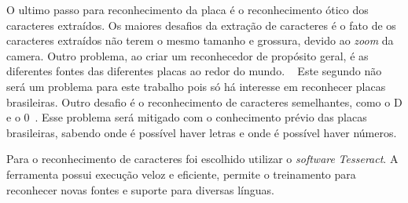 O ultimo passo para reconhecimento da placa é o reconhecimento ótico dos caracteres extraídos. Os maiores
desafios da extração de caracteres é o fato de os caracteres extraídos não terem o mesmo tamanho e grossura, devido 
ao \emph{zoom} da camera. Outro problema, ao criar um reconhecedor de propósito geral, é as diferentes fontes das diferentes 
placas ao redor do mundo. ~\cite{s2013automatic} Este segundo não será um problema para este trabalho pois só há interesse em 
reconhecer placas brasileiras. Outro desafio é o reconhecimento de caracteres semelhantes, como o D e o 0~\cite{ho2016intelligent}.
Esse problema será mitigado com o conhecimento prévio das placas brasileiras, sabendo onde é possível haver letras e onde é 
possível haver números.

Para o reconhecimento de caracteres foi escolhido utilizar o \emph{software} \emph{Tesseract}. A ferramenta possui execução 
veloz e eficiente, permite o treinamento para reconhecer novas fontes e suporte para diversas línguas.
